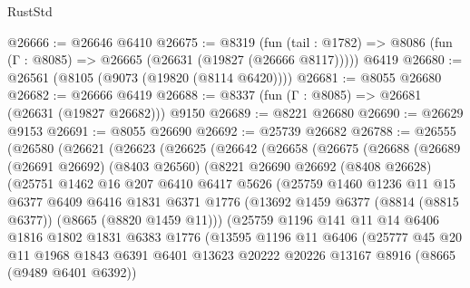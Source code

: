 \begin{lexlean}{RustStd}
\begin{coremodule}
@26666 := @26646 @6410
@26675 := @8319
    (fun (tail : @1782) => @8086 (fun (Γ : @8085) => @26665 (@26631 (@19827 (@26666 @8117)))))
    @6419
@26680 := @26561 (@8105 (@9073 (@19820 (@8114 @6420))))
@26681 := @8055 @26680
@26682 := @26666 @6419
@26688 := @8337 (fun (Γ : @8085) => @26681 (@26631 (@19827 @26682))) @9150
@26689 := @8221 @26680
@26690 := @26629 @9153
@26691 := @8055 @26690
@26692 := @25739 @26682
@26788 := @26555
    (@26580
      (@26621
        (@26623
          (@26625
            (@26642
              (@26658
                (@26675
                  (@26688
                    (@26689
                      (@26691 @26692)
                      (@8403 @26560)
                      (@8221
                        @26690
                        @26692
                        (@8408 @26628)
                        (@25751
                          @1462
                          @16
                          @207
                          @6410
                          @6417
                          @5626
                          (@25759
                            @1460
                            @1236
                            @11
                            @15
                            @6377
                            @6409
                            @6416
                            @1831
                            @6371
                            @1776
                            (@13692 @1459 @6377 (@8814 (@8815 @6377)) (@8665 (@8820 @1459 @11)))
                            (@25759
                              @1196
                              @141
                              @11
                              @14
                              @6406
                              @1816
                              @1802
                              @1831
                              @6383
                              @1776
                              (@13595
                                @1196
                                @11
                                @6406
                                (@25777
                                  @45
                                  @20
                                  @11
                                  @1968
                                  @1843
                                  @6391
                                  @6401
                                  @13623
                                  @20222
                                  @20226
                                  @13167
                                  @8916
                                  (@8665 (@9489 @6401 @6392))

\end{coremodule}
\end{lexlean}
